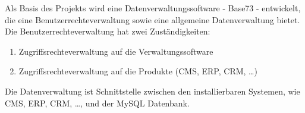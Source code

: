 Als Basis des Projekts wird eine Datenverwaltungssoftware - Base73 - entwickelt, die
eine Benutzerrechteverwaltung sowie eine allgemeine Datenverwaltung bietet.
Die Benutzerrechteverwaltung hat zwei Zuständigkeiten:
\begin{enumerate}
	\item Zugriffsrechteverwaltung auf die Verwaltungssoftware
	\item Zugriffsrechteverwaltung auf die Produkte (\gls{CMS}, \gls{ERP}, CRM, \ldots)
\end{enumerate}
Die Datenverwaltung ist Schnittstelle zwischen den installierbaren Systemen, wie CMS, ERP, CRM, \ldots, und der MySQL Datenbank.